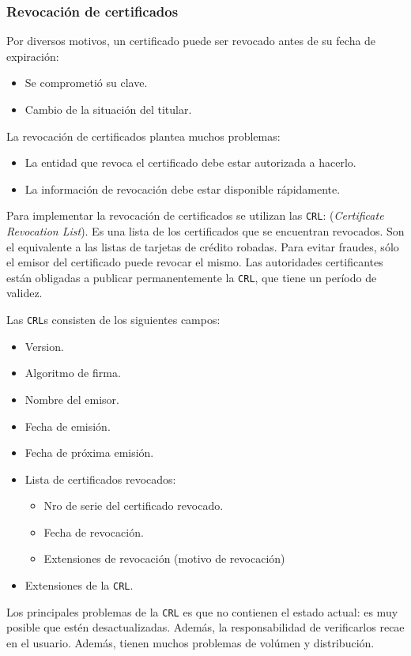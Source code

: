 \subsubsection{Revocación de certificados}
Por diversos motivos, un certificado puede ser revocado antes de su fecha de expiración:
\begin{itemize}
	\item Se comprometió su clave.
	\item Cambio de la situación del titular.
\end{itemize}

La revocación de certificados plantea muchos problemas:
\begin{itemize}
	\item La entidad que revoca el certificado debe estar autorizada a hacerlo.
	\item La información de revocación debe estar disponible rápidamente.
\end{itemize}

Para implementar la revocación de certificados se utilizan las \texttt{CRL}: (\emph{Certificate Revocation List}). Es una lista de los certificados que se encuentran revocados. Son el equivalente a las listas de tarjetas de crédito robadas. Para evitar fraudes, sólo el emisor del certificado puede revocar el mismo. Las autoridades certificantes están obligadas a publicar permanentemente la \texttt{CRL}, que tiene un período de validez. 

Las \texttt{CRL}s consisten de los siguientes campos:
\begin{itemize}
	\item Version.
	\item Algoritmo de firma.
	\item Nombre del emisor.
	\item Fecha de emisión.
	\item Fecha de próxima emisión.
	\item Lista de certificados revocados:
	\begin{itemize}
		\item Nro de serie del certificado revocado.
		\item Fecha de revocación.
		\item Extensiones de revocación (motivo de revocación)
	\end{itemize}
	\item Extensiones de la \texttt{CRL}.
\end{itemize}

Los principales problemas de la \texttt{CRL} es que no contienen el estado actual: es muy posible que estén desactualizadas. Además, la responsabilidad de verificarlos recae en el usuario. Además, tienen muchos problemas de volúmen y distribución.

